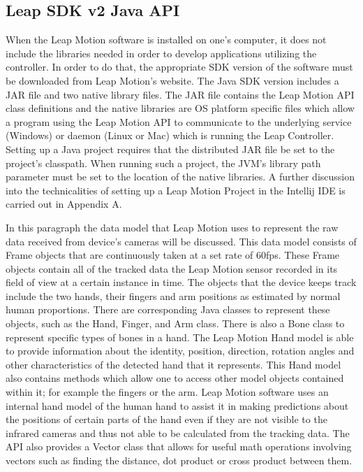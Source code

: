 	
\subsection{Leap SDK v2 Java API}
When the Leap Motion software is installed on one's computer, it does not include the libraries needed in order to develop applications utilizing the controller. In order to do that, the appropriate SDK version of the software must be downloaded from Leap Motion's website. The Java SDK version includes a JAR file and two native library files. The JAR file contains the Leap Motion API class definitions and the native libraries are OS platform specific files which allow a program using the Leap Motion API to communicate to the underlying service (Windows) or daemon (Linux or Mac) which is running the Leap Controller. Setting up a Java project requires that the distributed JAR file be set to the project's classpath. When running such a project, the JVM's library path parameter must be set to the location of the native libraries. A further discussion into the technicalities of setting up a Leap Motion Project in the Intellij IDE is carried out in Appendix A.


In this paragraph the data model that Leap Motion uses to represent the raw data received from device's cameras will be discussed. This data model consists of Frame objects that are continuously taken at a set rate of 60fps. These Frame objects contain all of the tracked data the Leap Motion sensor recorded in its field of view at a certain instance in time. The objects that the device keeps track include the two hands, their fingers and arm positions as estimated by normal human proportions. There are corresponding Java classes to represent these objects, such as the Hand, Finger, and Arm class. There is also a Bone class to represent specific types of bones in a hand. The Leap Motion Hand model is able to provide information about the identity, position, direction, rotation angles and other characteristics of the detected hand that it represents. This Hand model also contains methods which allow one to access other model objects contained within it; for example the fingers or the arm. Leap Motion software uses an internal hand model of the human hand to assist it in making predictions about the positions of certain parts of the hand even if they are not visible to the infrared cameras and thus not able to be calculated from the tracking data. The API also provides a Vector class that allows for useful math operations involving vectors such as finding the distance, dot product or cross product between them. 

